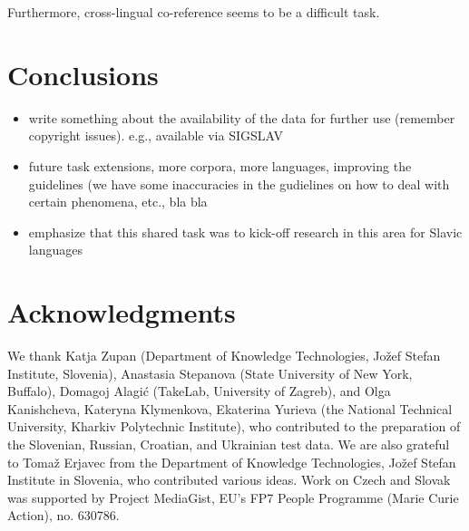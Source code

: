 \documentclass[11pt]{article}
\begin{document}
Furthermore, cross-lingual co-reference seems to be a difficult task.


\section{Conclusions}
\label{sec:conclusions}


\begin{itemize}

\item write something about the availability of the data for further use (remember copyright issues). e.g.,
available via SIGSLAV 

\item future task extensions, more corpora, more languages, improving the guidelines (we have some inaccuracies
in the gudielines on how to deal with certain phenomena, etc., bla bla

\item emphasize that this shared task was to kick-off research in this area for Slavic languages

\end{itemize}


\section*{Acknowledgments}


We thank Katja Zupan (Department of Knowledge Technologies, Jožef Stefan
Institute, Slovenia), Anastasia Stepanova (State University of New York,
Buffalo), Domagoj Alagić (TakeLab, University of Zagreb), and Olga
Kanishcheva, Kateryna Klymenkova, Ekaterina Yurieva (the National
Technical University, Kharkiv Polytechnic Institute), who contributed to
the preparation of the Slovenian, Russian, Croatian, and Ukrainian test
data.  
%
We are also grateful to Tomaž Erjavec from the Department of Knowledge
Technologies, Jožef Stefan Institute in Slovenia, who contributed various
ideas.
%
Work on Czech and Slovak was supported by Project MediaGist, EU's FP7
People Programme (Marie Curie Action), no. 630786.





\end{document}
